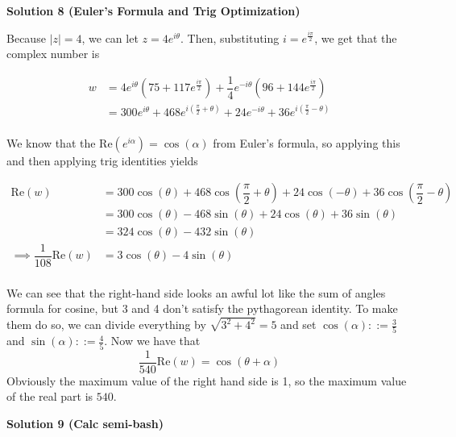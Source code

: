 \begin{enumerate}
 



\textbf{Solution 8 (Euler's Formula and Trig Optimization)}

Because $|z|=4$, we can let $z=4e^{i\theta}$. Then, substituting $i=e^{\frac{i\pi}{2}}$, we get that the complex number is 

 \begin{align*}w&=4e^{i\theta}(75+117e^{\frac{i\pi}{2}})+\dfrac{1}{4}e^{-i\theta}(96+144e^{\frac{i\pi}{2}})\\&=300e^{i\theta}+468e^{i(\frac{\pi}{2}+\theta)}+24e^{-i\theta}+36e^{i(\frac{\pi}{2}-\theta)}\\\end{align*}


 We know that the $\text{Re}(e^{i\alpha})=\cos(\alpha)$ from Euler's formula, so applying this and then applying trig identities yields

 \begin{align*}\text{Re}(w)&=300\cos{(\theta)}+468\cos{(\dfrac{\pi}{2}+\theta)}+24\cos{(-\theta)}+36\cos{(\dfrac{\pi}{2}-\theta)}\\&=300\cos{(\theta)}-468\sin{(\theta)}+24\cos{(\theta)}+36\sin{(\theta)}\\&=324\cos{(\theta)}-432\sin{(\theta)}\\\implies \dfrac{1}{108}\text{Re}(w)&=3\cos{(\theta)}-4\sin{(\theta)}\\\end{align*}


 We can see that the right-hand side looks an awful lot like the sum of angles formula for cosine, but 3 and 4 don't satisfy the pythagorean identity. To make them do so, we can divide everything by $\sqrt{3^2+4^2}=5$ and set $\cos{(\alpha)}::=\frac{3}{5}$ and $\sin{(\alpha)}::=\frac{4}{5}$. Now we have that 
 \[\dfrac{1}{540}\text{Re}(w)=\cos{(\theta+\alpha)}\]Obviously the maximum value of the right hand side is 1, so the maximum value of the real part is $\boxed{540}$.

 



\textbf{Solution 9 (Calc semi-bash)}


\end{enumerate}

